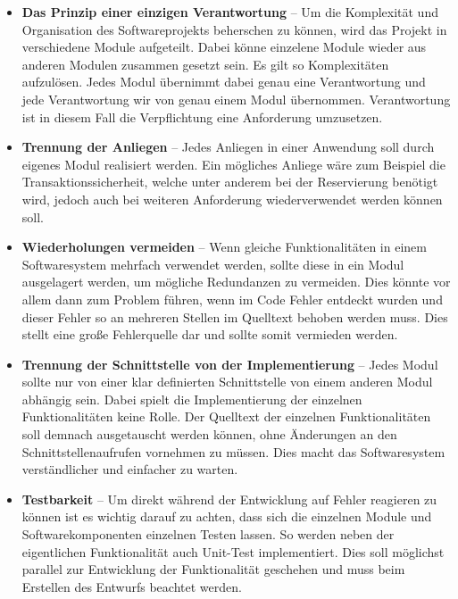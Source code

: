 			\begin{itemize}
				\item \textbf{Das Prinzip einer einzigen Verantwortung} -- Um die Komplexität und Organisation des Softwareprojekts beherschen zu können, wird das Projekt in verschiedene Module aufgeteilt. Dabei könne einzelene Module wieder aus anderen Modulen zusammen gesetzt sein. Es gilt so Komplexitäten aufzulösen. Jedes Modul übernimmt dabei genau eine Verantwortung und jede Verantwortung wir von genau einem Modul übernommen. Verantwortung ist in diesem Fall die Verpflichtung eine Anforderung umzusetzen. \autocite[Vgl.][]{Lahres.2015}
				
				\item \textbf{Trennung der Anliegen} -- Jedes Anliegen in einer Anwendung soll durch eigenes Modul realisiert werden. Ein mögliches Anliege wäre zum Beispiel die Transaktionssicherheit, welche unter anderem bei der Reservierung benötigt wird, jedoch auch bei weiteren Anforderung wiederverwendet werden können soll.\autocite[Vgl.][]{Lahres.2015} 
				
				\item \textbf{Wiederholungen vermeiden} -- Wenn gleiche Funktionalitäten in einem Softwaresystem mehrfach verwendet werden, sollte diese in ein Modul ausgelagert werden, um mögliche Redundanzen zu vermeiden. Dies könnte vor allem dann zum Problem führen, wenn im Code Fehler entdeckt wurden und dieser Fehler so an mehreren Stellen im Quelltext behoben werden muss. Dies stellt eine große Fehlerquelle dar und sollte somit vermieden werden.\autocite[Vgl.][]{Lahres.2015}
				 
				\item \textbf{Trennung der Schnittstelle von der Implementierung} -- Jedes Modul sollte nur von einer klar definierten Schnittstelle von einem anderen Modul abhängig sein. Dabei spielt die Implementierung der einzelnen Funktionalitäten keine Rolle. Der Quelltext der einzelnen Funktionalitäten soll demnach ausgetauscht werden können, ohne Änderungen an den Schnittstellenaufrufen vornehmen zu müssen. Dies macht das Softwaresystem verständlicher und einfacher zu warten.\autocite[Vgl.][]{Lahres.2015} 
				
				\item \textbf{Testbarkeit} -- Um direkt während der Entwicklung auf Fehler reagieren zu können ist es wichtig darauf zu achten, dass sich die einzelnen Module und Softwarekomponenten einzelnen Testen lassen. So werden neben der eigentlichen Funktionalität auch Unit-Test implementiert. Dies soll möglichst parallel zur Entwicklung der Funktionalität geschehen und muss beim Erstellen des Entwurfs beachtet werden.\autocite[Vgl.][]{Lahres.2015} 
			\end{itemize} 
		
